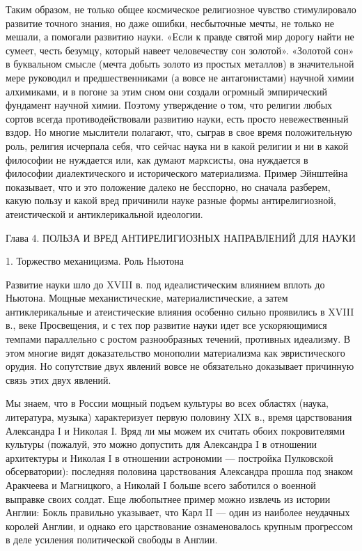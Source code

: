 Таким образом, не только общее космическое религиозное чувство стимулировало
развитие точного знания, но даже ошибки, несбыточные мечты, не только не
мешали, а помогали развитию науки. «Если к правде святой мир дорогу найти не
сумеет, честь безумцу, который навеет человечеству сон золотой». «Золотой сон»
в буквальном смысле (мечта добыть золото из простых металлов) в значительной
мере руководил и предшественниками (а вовсе не антагонистами) научной химии
алхимиками, и в погоне за этим сном они создали огромный эмпирический фундамент
научной химии. Поэтому утверждение о том, что религии любых сортов всегда
противодействовали развитию науки, есть просто невежественный вздор. Но многие
мыслители полагают, что, сыграв в свое время положительную роль, религия
исчерпала себя, что сейчас наука ни в какой религии и ни в какой философии не
нуждается или, как думают марксисты, она нуждается в философии диалектического
и исторического материализма. Пример Эйнштейна показывает, что и это положение
далеко не бесспорно, но сначала разберем, какую пользу и какой вред причинили
науке разные формы антирелигиозной, атеистической и антиклерикальной идеологии.

Глава 4. ПОЛЬЗА И ВРЕД АНТИРЕЛИГИОЗНЫХ НАПРАВЛЕНИЙ ДЛЯ НАУКИ

1. Торжество механицизма. Роль Ньютона

Развитие науки шло до XVIII в. под идеалистическим влиянием вплоть до Ньютона.
Мощные механистические, материалистические, а затем антиклерикальные и
атеистические влияния особенно сильно проявились в XVIII в., веке Просвещения,
и с тех пор развитие науки идет все ускоряющимися темпами параллельно с ростом
разнообразных течений, противных идеализму. В этом многие видят доказательство
монополии материализма как эвристического орудия. Но сопутствие двух явлений
вовсе не обязательно доказывает причинную связь этих двух явлений.

Мы знаем, что в России мощный подъем культуры во всех областях (наука,
литература, музыка) характеризует первую половину XIX в., время царствования
Александра I и Николая I. Вряд ли мы можем их считать обоих покровителями
культуры (пожалуй, это можно допустить для Александра I в отношении архитектуры
и Николая I в отношении астрономии --- постройка Пулковской обсерватории):
последняя половина царствования Александра прошла под знаком Аракчеева и
Магницкого, а Николай I больше всего заботился о военной выправке своих солдат.
Еще любопытнее пример можно извлечь из истории Англии: Бокль правильно
указывает, что Карл II --- один из наиболее неудачных королей Англии, и однако
его царствование ознаменовалось крупным прогрессом в деле усиления политической
свободы в Англии.

